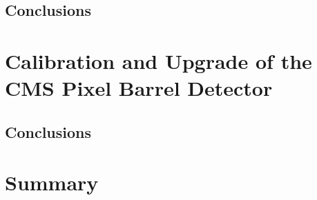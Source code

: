 \documentclass[a4paper, 11pt, twoside, openany]{ThesisStyle}
\begin{document}
			
	
	

	

	

\chapter{Conclusions}

\part{Calibration and Upgrade of the CMS Pixel Barrel Detector}

	

	
					
\chapter{Conclusions}

\part{Summary}					
\end{document}
